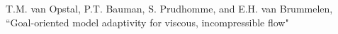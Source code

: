 T.M. van Opstal, P.T. Bauman, S. Prudhomme, and E.H. van Brummelen,
``Goal-oriented model adaptivity for viscous, incompressible flow"
